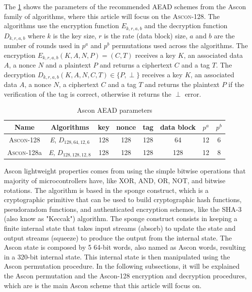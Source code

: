 \documentclass[11pt,twoside]{article}
\begin{document}
The \cref{table:1} shows the parameters of the recommended AEAD schemes from the Ascon family of algorithms, where this article will focus on the \textsc{Ascon-128}. The algorithms use the encryption function $\textit{E}_{k,r,a,b}$ and the decryption function $\textit{D}_{k,r,a,b}$ where $k$ is the key size, $r$ is the rate (data block) size, $a$ and $b$ are the number of rounds used in $p^a$ and $p^b$ permutations used across the algorithms. The encryption $\textit{E}_{k,r,a,b}(K, A, N, P) = (C, T)$ receives a key $K$, an associated data $A$, a nonce $N$ and a plaintext $P$ and returns a ciphertext $C$ and a tag $T$. The decryption $\textit{D}_{k,r,a,b}(K, A, N, C, T) \in \{P, \perp\}$ receives a key $K$, an associated data $A$, a nonce $N$, a ciphertext $C$ and a tag $T$ and returns the plaintext $P$ if the verification of the tag is correct, otherwise it returns the $\perp$ error.

\begin{table}
  \centering
  \begin{tabular}{|c|c|cccc|cc|}
    \hline
    \textbf{Name}       & \textbf{Algorithms}                     & \textbf{key} & \textbf{nonce} & \textbf{tag} & \textbf{data block} & \textbf{$p^a$} & \textbf{$p^b$} \\ \hline
    \textsc{Ascon-128}  & \textit{E}, $\textit{D}_{128,64,12,6}$  & 128          & 128            & 128          & 64                  & 12             & 6              \\ \hline
    \textsc{Ascon-128}a & \textit{E}, $\textit{D}_{128,128,12,8}$ & 128          & 128            & 128          & 128                 & 12             & 8              \\ \hline
  \end{tabular}
  \caption{Ascon AEAD parameters}
  \label{table:1}
\end{table}

Ascon lightweight properties comes from using the simple bitwise operations that majority of microcontrollers have, like XOR, AND, OR, NOT, and bitwise rotations. The algorithm is based in the sponge construct, which is a cryptographic primitive that can be used to build cryptographic hash functions, pseudorandom functions, and authenticated encryption schemes, like the SHA-3 (also know as "Keccak") \cite{bertoni2015keccak} algorithm. The sponge construct consists in keeping a finite internal state that takes input streams (absorb) to update the state and output streams (squeeze) to produce the output from the internal state. The Ascon state is composed by 5 64-bit words, also named as Ascon words, resulting in a 320-bit internal state. This internal state is then manipulated using the Ascon permutation procedure. In the following subsections, it will be explained the Ascon permutation and the Ascon-128 encryption and decryption procedures, which are is the main Ascon scheme that this article will focus on.
\end{document}
